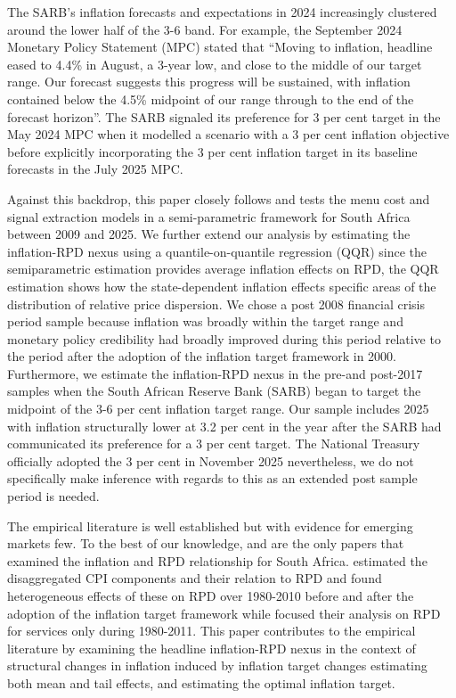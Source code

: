 \documentclass[
  letterpaper,
  DIV=11,
  numbers=noendperiod]{scrartcl}
\begin{document}
The SARB's inflation forecasts and expectations in 2024 increasingly
clustered around the lower half of the 3-6 band. For example, the
September 2024 Monetary Policy Statement (MPC) stated that ``Moving to
inflation, headline eased to 4.4\% in August, a 3-year low, and close to
the middle of our target range. Our forecast suggests this progress will
be sustained, with inflation contained below the 4.5\% midpoint of our
range through to the end of the forecast horizon''. The SARB signaled
its preference for 3 per cent target in the May 2024 MPC when it
modelled a scenario with a 3 per cent inflation objective before
explicitly incorporating the 3 per cent inflation target in its baseline
forecasts in the July 2025 MPC.

Against this backdrop, this paper closely follows \citet{caraballo2013}
and tests the menu cost and signal extraction models in a
semi-parametric framework \citep{robinson1988a} for South Africa between
2009 and 2025. We further extend our analysis by estimating the
inflation-RPD nexus using a quantile-on-quantile regression (QQR) since
the semiparametric estimation provides average inflation effects on RPD,
the QQR estimation shows how the state-dependent inflation effects
specific areas of the distribution of relative price dispersion. We
chose a post 2008 financial crisis period sample because inflation was
broadly within the target range and monetary policy credibility had
broadly improved during this period relative to the period after the
adoption of the inflation target framework in 2000. Furthermore, we
estimate the inflation-RPD nexus in the pre-and post-2017 samples when
the South African Reserve Bank (SARB) began to target the midpoint of
the 3-6 per cent inflation target range. Our sample includes 2025 with
inflation structurally lower at 3.2 per cent in the year after the SARB
had communicated its preference for a 3 per cent target. The National
Treasury officially adopted the 3 per cent in November 2025
nevertheless, we do not specifically make inference with regards to this
as an extended post sample period is needed.

The empirical literature is well established but with evidence for
emerging markets few. To the best of our knowledge, \citet{ndou2014} and
\citet{ndou2017} are the only papers that examined the inflation and RPD
relationship for South Africa. \citet{ndou2014} estimated the
disaggregated CPI components and their relation to RPD and found
heterogeneous effects of these on RPD over 1980-2010 before and after
the adoption of the inflation target framework while \citet{ndou2017}
focused their analysis on RPD for services only during 1980-2011. This
paper contributes to the empirical literature by examining the headline
inflation-RPD nexus in the context of structural changes in inflation
induced by inflation target changes estimating both mean and tail
effects, and estimating the optimal inflation target.
\end{document}
